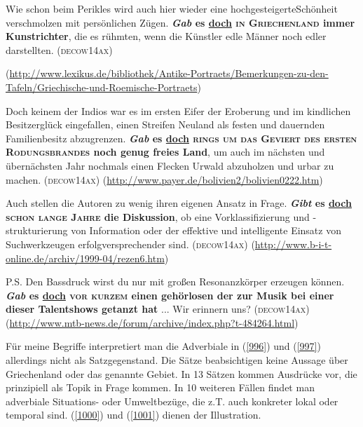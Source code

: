 {\begin{exe}
	\ex\label{996} 

	Wie schon beim Perikles wird auch hier wieder eine hochgesteigerte\linebreak Schönheit verschmolzen mit persönlichen Zügen. \textbf{\textit{Gab} es 		\ul{doch} \textsc{in Griechenland} immer Kunstrichter}, die es rühmten, wenn die Künstler edle Männer noch edler darstellten.	 		
	\hfill\hbox{\scshape(decow14ax)}
	\begin{sloppypar}
	{\scriptsize(\url{http://www.lexikus.de/bibliothek/Antike-Portraets/Bemerkungen-zu-den-Tafeln/Griechische-und-Roemische-Portraets})}\end{sloppypar}
\end{exe}

\begin{exe}
	\ex\label{997} 

	Doch keinem der Indios war es im ersten Eifer der Eroberung und im kindlichen Besitzerglück eingefallen, einen Streifen Neuland als festen und 				dauernden Familienbesitz abzugrenzen. \textbf{\textit{Gab} es \ul{doch} \textsc{rings um das Geviert des ersten Rodungsbrandes} noch genug 			freies Land}, um auch im nächsten und übernächsten Jahr nochmals einen Flecken Urwald abzuholzen und urbar zu machen.	
	\hfill\hbox{\scshape(decow14ax)}
	\newline
	{\scriptsize(\url{http://www.payer.de/bolivien2/bolivien0222.htm})}
\end{exe}	
	
\begin{exe}
	\ex\label{998} 

	Auch stellen die Autoren zu wenig ihren eigenen Ansatz in Frage. \textbf{\textit{Gibt} es \ul{doch} \textsc{schon lange Jahre} die Diskussion}, 		ob eine Vorklassifizierung und -strukturierung von Information oder der effektive und intelligente Einsatz von Suchwerkzeugen erfolgversprechender 		sind.	 		
	\hfill\hbox{\scshape(decow14ax)}
	\newline
	{\scriptsize(\url{http://www.b-i-t-online.de/archiv/1999-04/rezen6.htm})}
\end{exe}								                  

\begin{exe}
	\ex\label{999} 

	P.S. Den Bassdruck wirst du nur mit großen Resonanzkörper erzeugen können. \textbf{\textit{Gab} es \ul{doch} \textsc{vor kurzem} einen 				gehörlosen der zur 	Musik bei einer dieser Talentshows getanzt hat} ... Wir erinnern uns? 	 		
	\hfill\hbox{\scshape(decow14ax)}
	\newline
	{\scriptsize(\url{http://www.mtb-news.de/forum/archive/index.php?t-484264.html})}
\end{exe}				                    
Für meine Begriffe interpretiert man die Adverbiale in (\ref{996}) und (\ref{997}) allerdings nicht als Satzgegenstand. Die Sätze beabsichtigen keine Aussage über Griechenland oder das genannte Gebiet. In 13 Sätzen kommen Ausdrücke vor, die prinzi\-piell als Topik  in Frage kommen. In 10 weiteren Fällen findet man adverbiale Situations- oder Umweltbezüge, die z.T. auch konkreter lokal oder temporal sind. (\ref{1000}) und (\ref{1001}) dienen der Illustration.

}
